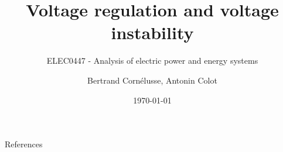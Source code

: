 \documentclass[aspectratio=169]{beamer}
\subtitle{ELEC0447 - Analysis of electric power and energy systems}
\title{Voltage regulation and voltage instability}
\author[BC]{Bertrand Cornélusse, Antonin Colot}
\institute{Univeristy of Liège}
\date{\today}
\begin{document}


\begin{frame}[allowframebreaks]{References}
    
    
\end{frame}
\end{document}
